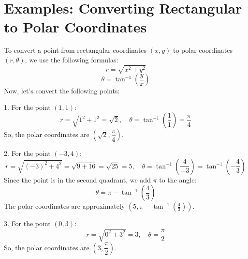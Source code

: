 \documentclass{article}
\begin{document}
\section*{Examples: Converting Rectangular to Polar Coordinates}
\begin{examplebox}
    To convert a point from rectangular coordinates $(x, y)$ to polar coordinates $(r, \theta)$, we use the following formulas:
    \[
    r = \sqrt{x^2 + y^2}
    \]
    \[
    \theta = \tan^{-1} \left( \frac{y}{x} \right)
    \]
    Now, let's convert the following points:
    \begin{exercisebox}
        1. For the point $(1, 1)$:
        \[
        r = \sqrt{1^2 + 1^2} = \sqrt{2}, \quad \theta = \tan^{-1} \left( \frac{1}{1} \right) = \frac{\pi}{4}
        \]
        So, the polar coordinates are $\left( \sqrt{2}, \dfrac{\pi}{4} \right)$.
    \end{exercisebox}
    
    \begin{exercisebox}
        2. For the point $(-3, 4)$:
        \[
        r = \sqrt{(-3)^2 + 4^2} = \sqrt{9 + 16} = \sqrt{25} = 5, \quad \theta = \tan^{-1} \left( \frac{4}{-3} \right) = \tan^{-1} \left( -\frac{4}{3} \right)
        \]
        Since the point is in the second quadrant, we add $\pi$ to the angle:
        \[
        \theta = \pi - \tan^{-1} \left( \frac{4}{3} \right)
        \]
        The polar coordinates are approximately $\left( 5, \pi - \tan^{-1} \left( \frac{4}{3} \right) \right)$.
    \end{exercisebox}
    
    \begin{exercisebox}
        3. For the point $(0, 3)$:
       \[
       r = \sqrt{0^2 + 3^2} = 3, \quad \theta = \frac{\pi}{2}
       \]
       So, the polar coordinates are $(3, \dfrac{\pi}{2})$.
    \end{exercisebox}
    \end{examplebox}
    
\end{document}
